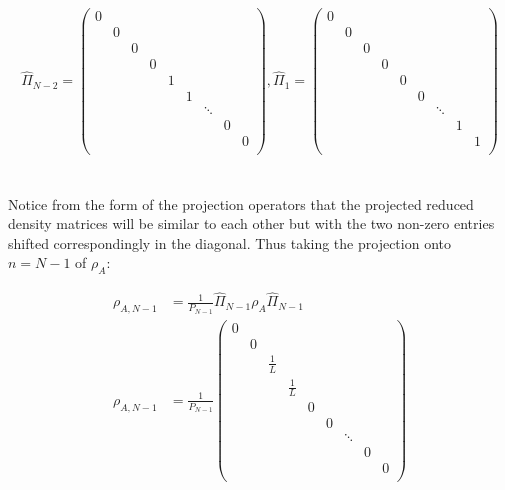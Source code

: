 \begin{equation}
\hat{\Pi}_{N-2} = \begin{pmatrix} 
0 \\
& 0 \\
& & 0 \\
& & & 0 \\
& & & &  1 \\
& & & & & 1 \\
& & & & &  & \ddots \\
& & & & & & &  0 \\
& & & & & & & &  0 \\
\end{pmatrix}
,
\hat{\Pi}_{1} = \begin{pmatrix} 
0 \\
& 0 \\
& & 0 \\
& & & 0 \\
& & & &  0 \\
& & & & & 0 \\
& & & & & & \ddots \\
& & & & & & &  1 \\
& & & & & & & &  1 \\
\end{pmatrix}
\end{equation} \\
\\
Notice from the form of the projection operators that the projected reduced density matrices will be similar to each other but with the two non-zero entries shifted correspondingly in the diagonal. Thus taking the projection onto $n=N-1$ of $\rho_{A}$:

\begin{equation}
\begin{aligned}
\rho_{A,N-1} &= \frac{1}{P_{N-1}} \hat{\Pi}_{N-1} \rho_{A} \hat{\Pi}_{N-1} \\
\rho_{A,N-1} &= \frac{1}{P_{N-1}} \begin{pmatrix} 
0 \\
& 0 \\
& & \frac{1}{L} \\
& & & \frac{1}{L} \\
& & & &  0 \\
& & & & & 0 \\
& & & & &  & \ddots \\
& & & & & & &  0 \\
& & & & & & & &  0 \\
\end{pmatrix} 
\end{aligned}
\end{equation}

